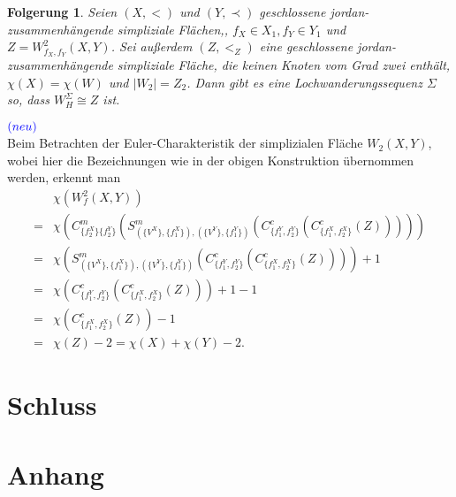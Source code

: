 \documentclass[12pt,titlepage]{article}
\newtheorem{folgerung}{Folgerung}[section]
\begin{document}
 \begin{folgerung} 
Seien $(X,<)$ und $(Y, \prec)$ geschlossene jordan-zusammenhängende simpliziale Flächen,, $f_X\in X_1 ,f_Y \in Y_1$ und $Z=W_{f_X,f_Y}^2(X,Y)$. Sei außerdem $(Z,<_Z)$ eine geschlossene jordan-zusammenhängende simpliziale Fläche, die keinen Knoten vom Grad zwei enthält, $\chi(X)=\chi(W)$ und $\vert W_2 \vert=Z_2$. Dann gibt es eine Lochwanderungssequenz $\Sigma$ so, dass $W_H^{\Sigma} \cong Z$ ist. 
\end{folgerung}
$ \textcolor{blue}{(neu)}$\\
Beim Betrachten der Euler-Charakteristik der simplizialen Fläche $W_2(X,Y)$, wobei hier die Bezeichnungen wie in der obigen Konstruktion übernommen werden, erkennt man 
\begin{align*}
&\chi(W^2_f(X,Y))\\
=&\chi(C^m_{\{f_2^X\}\{{f_2^Y}\}}(S^m_{(\{V^X\},\{f_1^X\}),(\{V^Y\},\{f_1^Y\})}(C^c_{\{f_1^Y,f_2^Y\}}(C^c_{\{f_1^X,f_2^X\}}(Z)))))\\
=&\chi(S^m_{(\{V^X\},\{f_1^X\}),(\{V^Y\},\{f_1^Y\})}(C^c_{\{f_1^Y,f_2^Y\}}(C^c_{\{f_1^X,f_2^X\}}(Z))))+1\\
=&\chi(C^c_{\{f_1^Y,f_2^Y\}}(C^c_{\{f_1^X,f_2^X\}}(Z)))+1-1\\
=&\chi(C^c_{\{f_1^X,f_2^X\}}(Z))-1\\
=&\chi(Z)-2=\chi(X)+\chi(Y)-2.
\end{align*}
\newpage
\section{Schluss}
\newpage
\section*{Anhang}

%
\end{document}
